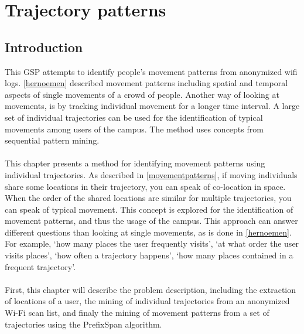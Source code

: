 \chapter{Trajectory patterns}\label{trajectories}
\section{Introduction}
This GSP attempts to identify people’s movement patterns from anonymized wifi logs. \autoref{hernoemen} described movement patterns including spatial and temporal aspects of single movements of a crowd of people. Another way of looking at movements, is by tracking individual movement for a longer time interval. A large set of individual trajectories can be used for the identification of typical movements among users of the campus. The method uses concepts from sequential pattern mining. \\\\
This chapter presents a method for identifying movement patterns using individual trajectories. As described in \autoref{movementpatterns}, if moving individuals share some locations in their trajectory, you can speak of co-location in space. When the order of the shared locations are similar for multiple trajectories, you can speak of typical movement. This concept is explored for the identification of movement patterns, and thus the usage of the campus. This approach can answer different questions than looking at single movements, as is done in \autoref{hernoemen}. For example, ‘how many places the user frequently visits’, ‘at what order the user visits places’, ‘how often a trajectory happens’, ‘how many places contained in a frequent trajectory’.\\\\
First, this chapter will describe the problem description, including the extraction of locations of a user, the mining of individual trajectories from an anonymized Wi-Fi scan list, and finaly the mining of movement patterns from a set of trajectories using the PrefixSpan algorithm.

